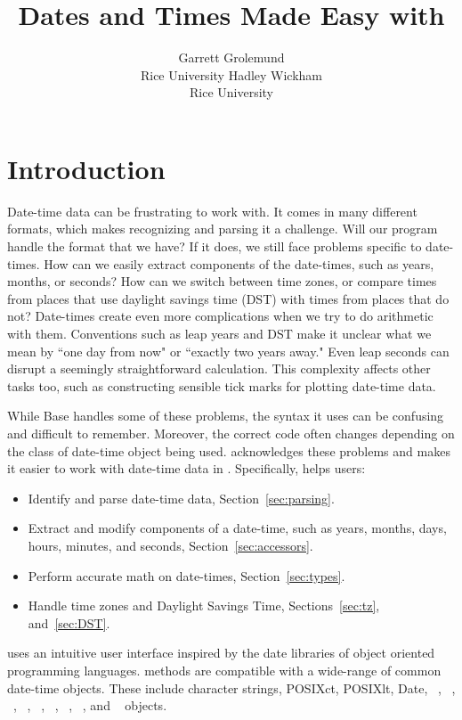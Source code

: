 \documentclass[article]{jss}
\author{Garrett Grolemund\\Rice University \And 
        Hadley Wickham\\Rice University}
\title{Dates and Times Made Easy with \pkg{lubridate}}
\begin{document}
\section{Introduction}

Date-time data can be frustrating to work with. It comes in many different formats, which makes recognizing and parsing it a challenge. Will our program handle the format that we have? If it does, we still face problems specific to date-times. How can we easily extract components of the date-times, such as years, months, or seconds? How can we switch between time zones, or compare times from places that use daylight savings time (DST) with times from places that do not? Date-times create even more complications when we try to do arithmetic with them. Conventions such as leap years and DST make it unclear what we mean by ``one day from now" or ``exactly two years away."  Even leap seconds can disrupt a seemingly straightforward calculation.  This complexity affects other tasks too, such as constructing sensible tick marks for plotting date-time data.

While Base  \citep{R} handles some of these problems, the syntax it uses can be confusing and difficult to remember. Moreover, the correct  code often changes depending on the class of date-time object being used.  acknowledges these problems and makes it easier to work with date-time data in . Specifically,  helps users:

\begin{itemize}
   \item Identify and parse date-time data, Section~\ref{sec:parsing}.
   
    \item Extract and modify components of a date-time, such as years, months, days, hours, minutes, and seconds, Section~\ref{sec:accessors}.
  
  \item Perform accurate math on date-times, Section~\ref{sec:types}.
    
  \item Handle time zones and Daylight Savings Time, Sections~\ref{sec:tz}, and~\ref{sec:DST}.
  
\end{itemize}

 uses an intuitive user interface inspired by the date libraries of object oriented programming languages.   methods are compatible with a wide-range of common date-time objects. These include character strings, POSIXct, POSIXlt, Date,  ~\citep{chron},  ~\citep{fCalendar},  ~\citep{zoo},  ~\citep{xts},  ~\citep{its},  ~\citep{tis},  ~\citep{timeSeries},  ~\citep{fts}, and  ~\citep{tseries} objects. 
\end{document}

